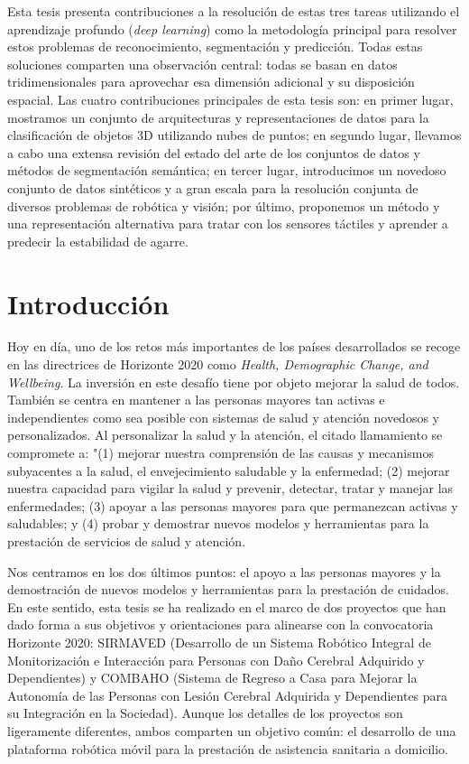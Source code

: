 Esta tesis presenta contribuciones a la resolución de estas tres tareas utilizando el aprendizaje profundo (\emph{deep learning}) como la metodología principal para resolver estos problemas de reconocimiento, segmentación y predicción. Todas estas soluciones comparten una observación central: todas se basan en datos tridimensionales para aprovechar esa dimensión adicional y su disposición espacial. Las cuatro contribuciones principales de esta tesis son: en primer lugar, mostramos un conjunto de arquitecturas y representaciones de datos para la clasificación de objetos 3D utilizando nubes de puntos; en segundo lugar, llevamos a cabo una extensa revisión del estado del arte de los conjuntos de datos y métodos de segmentación semántica; en tercer lugar, introducimos un novedoso conjunto de datos sintéticos y a gran escala para la resolución conjunta de diversos problemas de robótica y visión; por último, proponemos un método y una representación alternativa para tratar con los sensores táctiles y aprender a predecir la estabilidad de agarre.

\section{Introducción}

Hoy en día, uno de los retos más importantes de los países desarrollados se recoge en las directrices de Horizonte 2020 como \emph{Health, Demographic Change, and Wellbeing}. La inversión en este desafío tiene por objeto mejorar la salud de todos. También se centra en mantener a las personas mayores tan activas e independientes como sea posible con sistemas de salud y atención novedosos y personalizados. Al personalizar la salud y la atención, el citado llamamiento se compromete a: "(1) mejorar nuestra comprensión de las causas y mecanismos subyacentes a la salud, el envejecimiento saludable y la enfermedad; (2) mejorar nuestra capacidad para vigilar la salud y prevenir, detectar, tratar y manejar las enfermedades; (3) apoyar a las personas mayores para que permanezcan activas y saludables; y (4) probar y demostrar nuevos modelos y herramientas para la prestación de servicios de salud y atención.

Nos centramos en los dos últimos puntos: el apoyo a las personas mayores y la demostración de nuevos modelos y herramientas para la prestación de cuidados. En este sentido, esta tesis se ha realizado en el marco de dos proyectos que han dado forma a sus objetivos y orientaciones para alinearse con la convocatoria Horizonte 2020: SIRMAVED (Desarrollo de un Sistema Robótico Integral de Monitorización e Interacción para Personas con Daño Cerebral Adquirido y Dependientes) y COMBAHO (Sistema de Regreso a Casa para Mejorar la Autonomía de las Personas con Lesión Cerebral Adquirida y Dependientes para su Integración en la Sociedad). Aunque los detalles de los proyectos son ligeramente diferentes, ambos comparten un objetivo común: el desarrollo de una plataforma robótica móvil para la prestación de asistencia sanitaria a domicilio.

